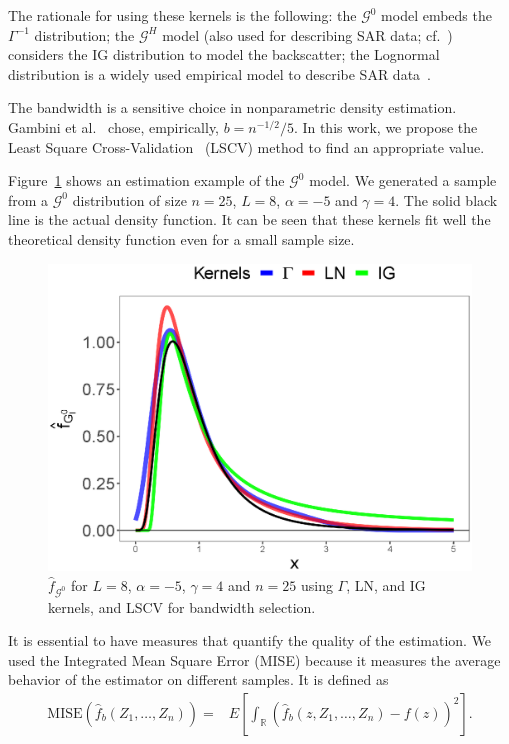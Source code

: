 \documentclass[twocolumn]{svjour3}
\begin{document}
	The rationale for using these kernels is the following:
	the $\mathcal{G}^0$ model embeds the $\Gamma^{-1}$ distribution;
	the $\mathcal{G}^H$ model (also used for describing SAR data; cf.~\cite{PolarimetricSegmentationBSplinesMSSP}) considers the IG distribution to model the backscatter;
	the Lognormal distribution is a widely used empirical model to describe SAR data~\cite{Gao2010}. 
	
	The bandwidth is a sensitive choice in nonparametric density estimation. 
	Gambini et al.~\cite{gambini2015} chose, empirically, $b=n^{-1/2}/5$. 
	In this work, we propose the Least Square Cross-Validation~\cite{Wu1997} (LSCV) method to find an appropriate value.
	
	Figure~\ref{EstimacionLNyGAyIG} shows an estimation example of the $\mathcal{G}^0$ model. 
	We generated a sample from a $\mathcal{G}^0$ distribution of size $n=25$, $L = 8$, $\alpha=-5$ and $\gamma=4$. 
	The solid black line is the actual density function. 
	It can be seen that these kernels fit well the theoretical density function even for a small sample size.
	
	\begin{figure}[hbt]
		\centering
		\includegraphics[scale=0.35]{../../../Figures/PaperTesis/NucleosGALNyIG.eps}
		\caption{$\widehat{f}_{\mathcal{G}^0}$ for $L=8$, $\alpha=-5$, $\gamma=4$ and $n=25$ using $\Gamma$, LN, and IG kernels, and LSCV for bandwidth selection.}\label{EstimacionLNyGAyIG}
	\end{figure}
	
	It is essential to have measures that quantify the quality of the estimation. 
	We used the Integrated Mean Square Error (MISE) because it measures the average behavior of the estimator on different samples. 
	It is defined as
	\begin{align}
		\label{Mise}
		\text{MISE}(\widehat{f}_b(Z_1,\ldots,Z_n))=&E\left[\int_\mathbb{R} (\widehat{f}_b(z,Z_1,\ldots,Z_n)-f(z))^2 \right].
	\end{align}
	
\end{document}
